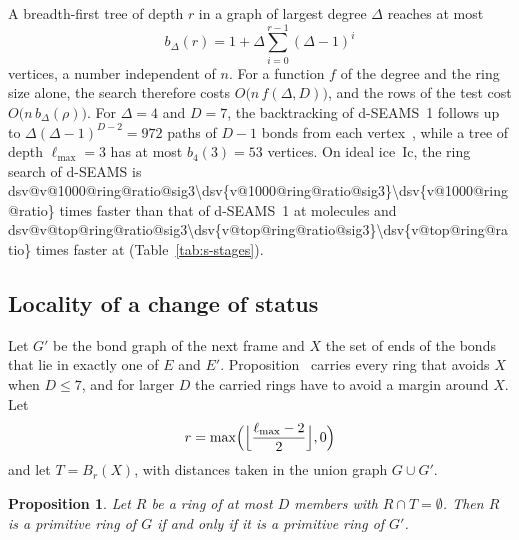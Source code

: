 \documentclass[preprint,12pt]{elsarticle}
\makeatletter
\newtheorem{proposition}{Proposition}
\newcommand{\rthree}[1]{\ifcsname dsv@#1@sig3\endcsname\num{\dsv{#1@sig3}}\else\num[round-mode=figures,round-precision=3]{\dsv{#1}}\fi}
\makeatother
\begin{document}
A breadth-first tree of depth $r$ in a graph of largest degree $\Delta$
reaches at most
\begin{equation}
  b_\Delta(r)=1+\Delta\sum_{i=0}^{r-1}(\Delta-1)^{i}
  \label{eq:s-ball}
\end{equation}
vertices, a number independent of $n$.
For a function $f$ of the degree and the ring size alone, the search
therefore costs $O\bigl(n\,f(\Delta,D)\bigr)$, and the rows of the test
cost $O\bigl(n\,b_\Delta(\rho)\bigr)$.
For $\Delta=4$ and $D=7$, the backtracking of d-SEAMS~1 follows up to
$\Delta(\Delta-1)^{D-2}=972$ paths of $D-1$ bonds from each
vertex~\cite{goswami2020dseams}, while a tree of depth $\ell_{\max}=3$
has at most $b_4(3)=53$ vertices.
On ideal ice~Ic, the ring search of d-SEAMS is
\rthree{v@1000@ring@ratio} times faster than that of d-SEAMS~1 at
 molecules and \rthree{v@top@ring@ratio} times faster at
 (Table~\ref{tab:s-stages}).

\subsection{Locality of a change of status}
\label{sec:s-locality}

Let $G'$ be the bond graph of the next frame and $X$ the set of ends of
the bonds that lie in exactly one of $E$ and $E'$.
Proposition~ carries every ring that avoids $X$ when
$D\le 7$, and for larger $D$ the carried rings have to avoid a margin
around $X$.
Let
\begin{equation}
  r=\max\Bigl(\Bigl\lfloor\frac{\ell_{\max}-2}{2}\Bigr\rfloor,0\Bigr)
  \label{eq:s-radius}
\end{equation}
and let $T=B_r(X)$, with distances taken in the union graph $G\cup G'$.

\begin{proposition}
\label{prop:s-locality} Let $R$ be a ring of at most $D$ members with
$R\cap T=\emptyset$.
Then $R$ is a primitive ring of $G$ if and only if it is a primitive
ring of $G'$.
\end{proposition}
\end{document}

